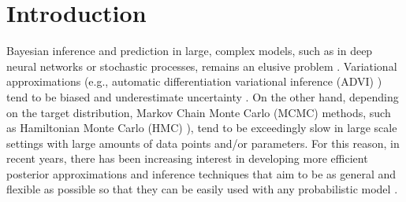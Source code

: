 \section{Introduction}
Bayesian inference and prediction in large, complex models, such as in 
deep neural networks or stochastic processes, remains an elusive problem \cite{blei2017variational,insua2012bayesian,alquier2020approximate}.
%
%
%
Variational approximations (e.g., automatic differentiation variational inference (ADVI) \cite{kucukelbir2017automatic}) tend to be biased and 
underestimate uncertainty \cite{riquelme2018failure}. 
On the other hand, depending on the target distribution,
Markov Chain Monte Carlo (MCMC) \cite{andrieu2010particle} 
methods, such 
as Hamiltonian Monte Carlo (HMC) \cite{neal2011mcmc}),   
tend to be exceedingly slow  \cite{van2018simple} {in large scale settings with large amounts of data points and/or parameters}. For this reason, in recent years, there has been increasing interest in developing more efficient posterior approximations \cite{nalisnick2016approximate,salimans2015markov,tran2015variational} and inference techniques that aim to be as general and flexible as possible {so that they can be easily used with any probabilistic model} \cite{wood2014new, ge2018t}.

